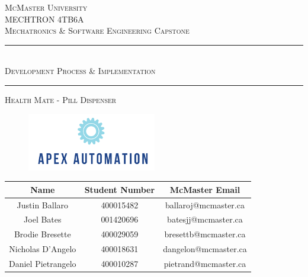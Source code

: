 \documentclass[12pt,titlepage]{article}
\begin{document}
\begin{titlepage}

\newcommand{\HRule}{\rule{\linewidth}{0.5mm}} %

\center %
 

\textsc{\LARGE McMaster University}\\[1.5cm] %
\textsc{\Large MECHTRON 4TB6A}\\[0.5cm] %
\textsc{\large Mechatronics \& Software Engineering Capstone}\\[0.5cm] %

\vspace{1cm}
\HRule \\[0.2cm]
{ \Large \vspace{0.25cm}  \textsc{  \LARGE Development Process \& Implementation} \vspace{0.3cm} }  %
\HRule \vspace{1cm}

\textsc{\LARGE Health Mate - Pill Dispenser}
 
 \begin{figure}[h]
  \centering
  \includegraphics[width=.4\linewidth]{../ApexEngineering.png}
\end{figure}
 \vspace{1cm}
 

\begin{table}[ht!]
\centering
\begin{tabular}{c c c}
\toprule
\textbf{Name} & \textbf{Student Number} & \textbf{McMaster Email}         \\ \midrule
Justin Ballaro & 400015482 & ballaroj@mcmaster.ca \\
Joel Bates & 001420696 & batesjj@mcmaster.ca \\
Brodie Bresette & 400029059 & bresettb@mcmaster.ca \\
Nicholas D'Angelo & 400018631 &  dangelon@mcmaster.ca  \\
Daniel Pietrangelo & 400010287 &  pietrand@mcmaster.ca \\
  \bottomrule
\end{tabular}
\label{Tab:HU}
\end{table}


\end{titlepage}
\end{document}
